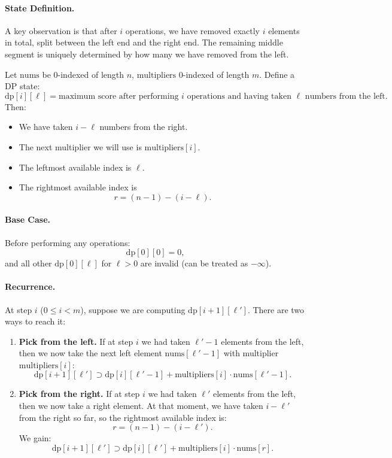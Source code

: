 \documentclass[9pt]{extarticle}
\begin{document}
\paragraph{State Definition.}
A key observation is that after \(i\) operations, we have removed exactly \(i\) elements in total, split between the left end and the right end. The remaining middle segment is uniquely determined by how many we have removed from the left.

Let \(\text{nums}\) be 0-indexed of length \(n\), \(\text{multipliers}\) 0-indexed of length \(m\).
Define a DP state:
\[
\text{dp}[i][\ell] = \text{maximum score after performing } i \text{ operations and having taken } \ell \text{ numbers from the left.}
\]
Then:
\begin{itemize}
    \item We have taken \(i - \ell\) numbers from the right.
    \item The next multiplier we will use is \(\text{multipliers}[i]\).
    \item The leftmost available index is \(\ell\).
    \item The rightmost available index is
    \[
    r = (n - 1) - (i - \ell).
    \]
\end{itemize}

\paragraph{Base Case.}
Before performing any operations:
\[
\text{dp}[0][0] = 0,
\]
and all other \(\text{dp}[0][\ell]\) for \(\ell > 0\) are invalid (can be treated as \(-\infty\)).

\paragraph{Recurrence.}
At step \(i\) (\(0 \le i < m\)), suppose we are computing \(\text{dp}[i+1][\ell']\). There are two ways to reach it:

\begin{enumerate}
    \item \textbf{Pick from the left.}  
    If at step \(i\) we had taken \(\ell'-1\) elements from the left, then we now take the next left element \(\text{nums}[\ell'-1]\) with multiplier \(\text{multipliers}[i]\):
    \[
    \text{dp}[i+1][\ell'] \supset \text{dp}[i][\ell'-1] + \text{multipliers}[i] \cdot \text{nums}[\ell'-1].
    \]

    \item \textbf{Pick from the right.}  
    If at step \(i\) we had taken \(\ell'\) elements from the left, then we now take a right element. At that moment, we have taken \(i - \ell'\) from the right so far, so the rightmost available index is:
    \[
    r = (n-1) - (i - \ell').
    \]
    We gain:
    \[
    \text{dp}[i+1][\ell'] \supset \text{dp}[i][\ell'] + \text{multipliers}[i] \cdot \text{nums}[r].
    \]
\end{enumerate}
\end{document}
